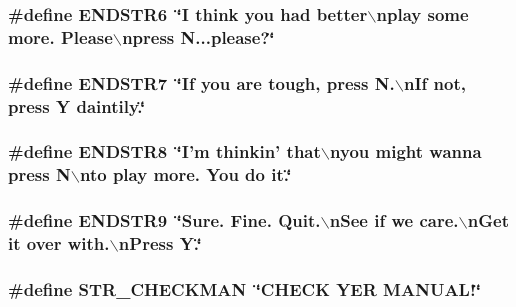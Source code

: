 \label{F__SPEAR_8H_aa347f66c99d6d6a02e69072252c48dd8}
\hypertarget{F__SPEAR_8H_a1f1c2b33af0de32d15fd1d81ad6e078d}{
\subsubsection[{ENDSTR6}]{\setlength{\rightskip}{0pt plus 5cm}\#define ENDSTR6~\char`\"{}I think you had better$\backslash$nplay some more. Please$\backslash$npress N...please?\char`\"{}}}
\label{F__SPEAR_8H_a1f1c2b33af0de32d15fd1d81ad6e078d}
\hypertarget{F__SPEAR_8H_a65e16b7b155633a4bcfc9dea47b13a3a}{
\subsubsection[{ENDSTR7}]{\setlength{\rightskip}{0pt plus 5cm}\#define ENDSTR7~\char`\"{}If you are tough, press N.$\backslash$nIf not, press Y daintily.\char`\"{}}}
\label{F__SPEAR_8H_a65e16b7b155633a4bcfc9dea47b13a3a}
\hypertarget{F__SPEAR_8H_ab6e045254affdd311a8dec7e9bad1666}{
\subsubsection[{ENDSTR8}]{\setlength{\rightskip}{0pt plus 5cm}\#define ENDSTR8~\char`\"{}I'm thinkin' that$\backslash$nyou might wanna press N$\backslash$nto play more. You do it.\char`\"{}}}
\label{F__SPEAR_8H_ab6e045254affdd311a8dec7e9bad1666}
\hypertarget{F__SPEAR_8H_ab0935f309370883fca32293da061d045}{
\subsubsection[{ENDSTR9}]{\setlength{\rightskip}{0pt plus 5cm}\#define ENDSTR9~\char`\"{}Sure. Fine. Quit.$\backslash$nSee if we care.$\backslash$nGet it over with.$\backslash$nPress Y.\char`\"{}}}
\label{F__SPEAR_8H_ab0935f309370883fca32293da061d045}
\hypertarget{F__SPEAR_8H_abe171a6d9c08dad95fad9031de9656b2}{
\subsubsection[{STR\_\-CHECKMAN}]{\setlength{\rightskip}{0pt plus 5cm}\#define STR\_\-CHECKMAN~\char`\"{}CHECK YER MANUAL!\char`\"{}}}

